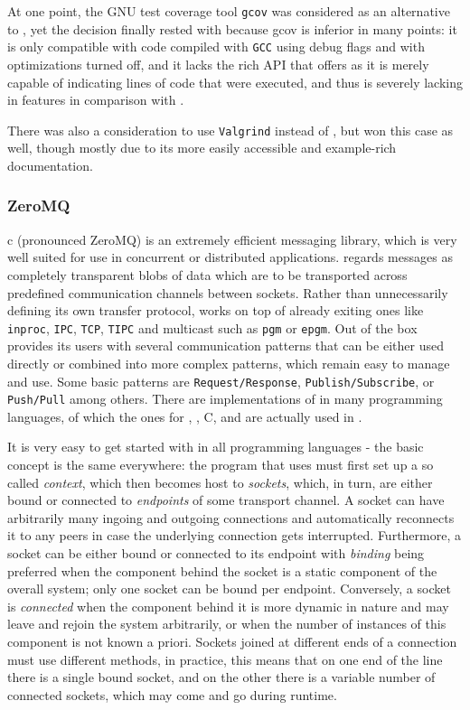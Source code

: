 At one point, the GNU test coverage tool \texttt{gcov}\cite{gcov} was considered as an alternative to 
\pin, yet the decision finally rested with \pin because gcov is inferior in many points: it is only
compatible with code compiled with \texttt{GCC} using debug flags and with optimizations turned off, and it
lacks the rich API that \pin offers as it is merely capable of indicating lines of code that were executed, and
thus is severely lacking in features in comparison with \pin.

There was also a consideration to use \texttt{Valgrind}\cite{Nethercote03valgrind:a} instead of \pin, but \pin
won this case as well, though mostly due to its more easily accessible and example-rich documentation. 
\tocless\subsubsection{ZeroMQ}
\label{sec:zmq}c
\zmq\cite{zmq} (pronounced {\small ZeroMQ}) is an extremely efficient messaging library, 
which is very well suited for use in concurrent or distributed applications. \zmq regards messages as 
completely transparent blobs of data which are to be transported across predefined communication channels 
between sockets. Rather than unnecessarily defining its own transfer protocol, \zmq works on top of already exiting 
ones like \texttt{inproc}, \texttt{IPC}, \texttt{TCP}, \texttt{TIPC} and multicast such as \texttt{pgm} or \texttt{epgm}.
Out of the box \zmq provides its users with several communication patterns that can be either used directly or combined 
into more complex patterns, which remain easy to manage and use. Some basic patterns are \texttt{Request/Response}, 
\texttt{Publish/Subscribe}, or \texttt{Push/Pull} among others.
There are implementations of \zmq in many programming languages, of which the ones for \java, \python, {\small C}, 
and \cpp are actually used in \xmlmate. 

It is very easy to get started with \zmq in all programming languages - the basic concept is the
same everywhere: the program that uses \zmq must first set up a so called \emph{context}, which then becomes
host to \emph{sockets}, which, in turn, are either bound or connected to \emph{endpoints} of some transport
channel. A socket can have arbitrarily many ingoing and outgoing connections and \zmq automatically reconnects
it to any peers in case the underlying connection gets interrupted. Furthermore, a socket can be either bound
or connected to its endpoint with \emph{binding} being preferred when the component behind the socket is a
static component of the overall system; only one socket can be bound per endpoint. Conversely, a socket is
\emph{connected} when the component behind it is more dynamic in nature and may leave and rejoin the system
arbitrarily, or when the number of instances of this component is not known a priori. Sockets joined at
different ends of a connection must use different methods, in practice, this means that on one end of the line
there is a single bound socket, and on the other there is a variable number of connected sockets, which may
come and go during runtime.

